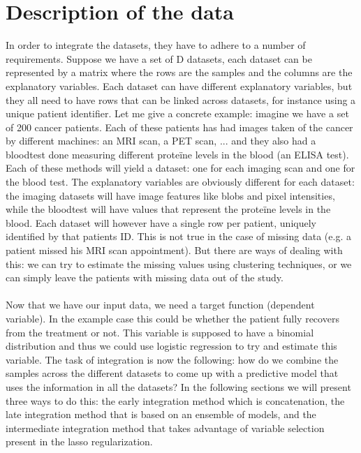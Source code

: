\section{Description of the data}
\label{sec:integration-description}
In order to integrate the datasets, they have to adhere to a number of requirements. Suppose we have a set of D datasets, each dataset can be represented by a matrix where the rows are the samples and the columns are the explanatory variables. Each dataset can have different explanatory variables, but they all need to have rows that can be linked across datasets, for instance using a unique patient identifier. Let me give a concrete example: imagine we have a set of 200 cancer patients. Each of these patients has had images taken of the cancer by different machines: an MRI scan, a PET scan, ... and they also had a bloodtest done measuring different prote\"{i}ne levels in the blood (an ELISA test). Each of these methods will yield a dataset: one for each imaging scan and one for the blood test. The explanatory variables are obviously different for each dataset: the imaging datasets will have image features like blobs and pixel intensities, while the bloodtest will have values that represent the prote\"{i}ne levels in the blood. Each dataset will however have a single row per patient, uniquely identified by that patients ID. This is not true in the case of missing data (e.g. a patient missed his MRI scan appointment). But there are ways of dealing with this: we can try to estimate the missing values using clustering techniques, or we can simply leave the patients with missing data out of the study. \\ \\
Now that we have our input data, we need a target function (dependent variable). In the example case this could be whether the patient fully recovers from the treatment or not. This variable is supposed to have a binomial distribution and thus we could use logistic regression to try and estimate this variable. The task of integration is now the following: how do we combine the samples across the different datasets to come up with a predictive model that uses the information in all the datasets? In the following sections we will present three ways to do this: the early integration method which is concatenation, the late integration method that is based on an ensemble of models, and the intermediate integration method that takes advantage of variable selection present in the lasso regularization.

